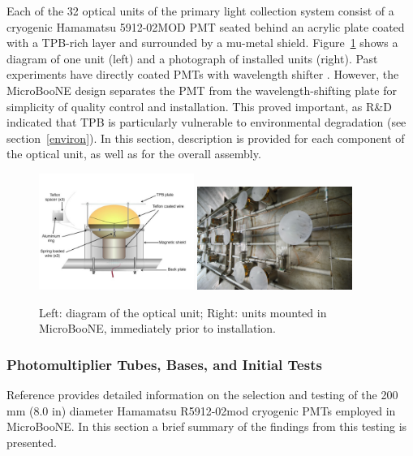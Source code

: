 Each of the 32 optical units of the primary light collection system consist of a cryogenic Hamamatsu 5912-02MOD PMT seated behind an acrylic plate coated with a TPB-rich layer and surrounded by a mu-metal shield. 
Figure~\ref{fig:unitmounted} shows a diagram of one unit (left) and a photograph of installed units (right).  Past experiments have directly coated PMTs with wavelength shifter \cite{Amerio:2004-T600}.  However, 
the MicroBooNE design separates the PMT from the wavelength-shifting plate for simplicity of quality control and installation.  This proved important, as R\&D indicated that TPB is particularly vulnerable to environmental degradation (see section~\ref{environ}).  In this section, description is provided for each component of the optical unit, as well as for the overall assembly.

\begin{figure}
	\centering
           \includegraphics[width=0.45\textwidth]{./figures/PMTmount2.pdf} 
           \includegraphics[width=0.45\textwidth]{./figures/13-0430-05D.jpg} 
        \caption{Left: diagram of the optical unit; Right: units mounted in MicroBooNE, immediately prior to \lartpc installation.}\label{fig:unitmounted}
 
\end{figure}



\subsubsection{Photomultiplier Tubes, Bases, and Initial Tests}
\label{sec:pmt-bases}

Reference \cite{Briese:2013wua} provides detailed information on the selection 
and testing of the 200 mm (8.0 in) diameter Hamamatsu R5912-02mod cryogenic PMTs employed in MicroBooNE.   
In this section a brief summary of the findings from this testing is presented.

